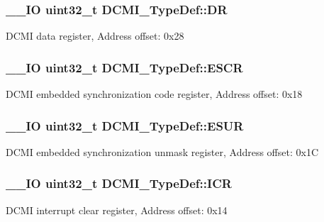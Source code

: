 \subsubsection[{D\+R}]{\setlength{\rightskip}{0pt plus 5cm}\+\_\+\+\_\+\+I\+O uint32\+\_\+t D\+C\+M\+I\+\_\+\+Type\+Def\+::\+D\+R}\label{struct_d_c_m_i___type_def_a266cec1031b0be730b0e35523f5e2934}
D\+C\+M\+I data register, Address offset\+: 0x28 \hypertarget{struct_d_c_m_i___type_def_a52c16b920a3f25fda961d0cd29749433}{}
\subsubsection[{E\+S\+C\+R}]{\setlength{\rightskip}{0pt plus 5cm}\+\_\+\+\_\+\+I\+O uint32\+\_\+t D\+C\+M\+I\+\_\+\+Type\+Def\+::\+E\+S\+C\+R}\label{struct_d_c_m_i___type_def_a52c16b920a3f25fda961d0cd29749433}
D\+C\+M\+I embedded synchronization code register, Address offset\+: 0x18 \hypertarget{struct_d_c_m_i___type_def_af00a94620e33f4eff74430ff25c12b94}{}
\subsubsection[{E\+S\+U\+R}]{\setlength{\rightskip}{0pt plus 5cm}\+\_\+\+\_\+\+I\+O uint32\+\_\+t D\+C\+M\+I\+\_\+\+Type\+Def\+::\+E\+S\+U\+R}\label{struct_d_c_m_i___type_def_af00a94620e33f4eff74430ff25c12b94}
D\+C\+M\+I embedded synchronization unmask register, Address offset\+: 0x1\+C \hypertarget{struct_d_c_m_i___type_def_a0371fc07916e3043e1151eaa97e172c9}{}
\subsubsection[{I\+C\+R}]{\setlength{\rightskip}{0pt plus 5cm}\+\_\+\+\_\+\+I\+O uint32\+\_\+t D\+C\+M\+I\+\_\+\+Type\+Def\+::\+I\+C\+R}\label{struct_d_c_m_i___type_def_a0371fc07916e3043e1151eaa97e172c9}
D\+C\+M\+I interrupt clear register, Address offset\+: 0x14 \hypertarget{struct_d_c_m_i___type_def_a91ce93b57d8382147574c678ee497c63}{}
